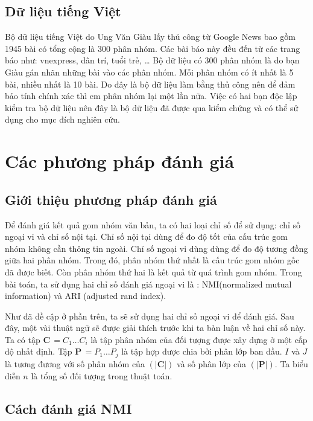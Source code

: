 \subsection{Dữ liệu tiếng Việt}
Bộ dữ liệu tiếng Việt do Ung Văn Giàu lấy thủ công từ Google News bao gồm 1945 bài có tổng cộng là 300 phân nhóm.
Các bài báo này đều đến từ các trang báo như: vnexpress, dân trí, tuổi trẻ, \ldots
Bộ dữ liệu có 300 phân nhóm là do bạn Giàu gán nhãn những bài vào các phân nhóm.
Mỗi phân nhóm có ít nhất là 5 bài, nhiều nhất là 10 bài.
Do đây là bộ dữ liệu làm bằng thủ công nên để đảm bảo tính chính xác thì em phân nhóm lại một lần nữa. 
Việc có hai bạn độc lập kiểm tra bộ dữ liệu nên đây là bộ dữ liệu đã được qua kiểm chứng và có thể sử dụng cho mục đích nghiên cứu.



\section{Các phương pháp đánh giá}

\subsection{Giới thiệu phương pháp đánh giá}
Để đánh giá kết quả gom nhóm văn bản, ta có hai loại chỉ số để sử dụng: chỉ số ngoại vi và chỉ số nội tại.
Chỉ số nội tại dùng để đo độ tốt của cấu trúc gom nhóm không cần thông tin ngoài.
Chỉ số ngoại vi dùng dùng để đo độ tương đồng giữa hai phân nhóm.
Trong đó, phân nhóm thứ nhất là cấu trúc gom nhóm gốc đã được biết.
Còn phân nhóm thứ hai là kết quả từ quá trình gom nhóm.
Trong bài toán, ta sử dụng hai chỉ số đánh giá ngoại vi là : NMI(normalized mutual information) và ARI (adjusted rand index).
	
Như đã đề cập ở phần trên, ta sẽ sử dụng hai chỉ số ngoại vi để đánh giá.
Sau đây, một vài thuật ngữ sẽ được giải thích trước khi ta bàn luận về hai chỉ số này.
Ta có tập $\textbf{C} \, = {C_1 \ldots C_i}$ là tập phân nhóm của đối tượng được xây dựng ở một cấp độ nhất định.
Tập $\textbf{P} \, = {P_1 \ldots P_j}$ là tập hợp được chia bởi phân lớp ban đầu.
$I$ và $J$ là tương đương với số phân nhóm của $(|\textbf{C}|)$ và số phân lớp của  $(|\textbf{P}|)$.
Ta biểu diễn $n$ là tổng số đối tượng trong thuật toán.

\subsection{Cách đánh giá NMI}

